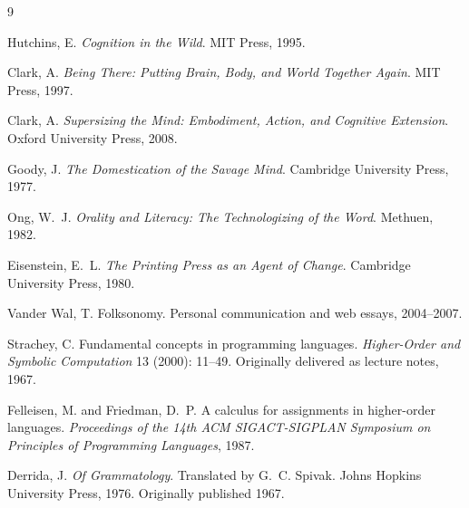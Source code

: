 \documentclass[12pt, a4paper]{article}
\begin{document}
\begin{thebibliography}{9}

Hutchins, E. \emph{Cognition in the Wild}. MIT Press, 1995.

Clark, A. \emph{Being There: Putting Brain, Body, and World Together Again}.
MIT Press, 1997.

Clark, A. \emph{Supersizing the Mind: Embodiment, Action, and Cognitive Extension}.
Oxford University Press, 2008.

Goody, J. \emph{The Domestication of the Savage Mind}. Cambridge University
Press, 1977.

Ong, W.~J. \emph{Orality and Literacy: The Technologizing of the Word}.
Methuen, 1982.

Eisenstein, E.~L. \emph{The Printing Press as an Agent of Change}. Cambridge
University Press, 1980.

Vander Wal, T. Folksonomy. Personal communication and web essays, 2004--2007.

Strachey, C. Fundamental concepts in programming languages. \emph{Higher-Order
and Symbolic Computation} 13 (2000): 11--49. Originally delivered as lecture
notes, 1967.

Felleisen, M. and Friedman, D.~P. A calculus for assignments in higher-order
languages. \emph{Proceedings of the 14th ACM SIGACT-SIGPLAN Symposium on
Principles of Programming Languages}, 1987.

Derrida, J. \emph{Of Grammatology}. Translated by G.~C. Spivak. Johns Hopkins
University Press, 1976. Originally published 1967.

\end{thebibliography}
\end{document}
